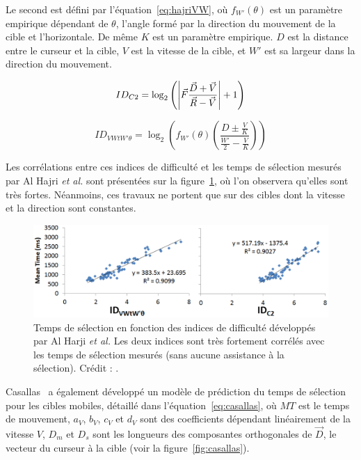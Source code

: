 	Le second est défini par l'équation~\ref{eq:hajriVW}, où $f_{W'}(\theta)$ est un paramètre empirique dépendant de $\theta$, l'angle formé par la direction du mouvement de la cible et l'horizontale. De même $K$ est un paramètre empirique. $D$ est la distance entre le curseur et la cible, $V$ est la vitesse de la cible, et $W'$ est sa largeur dans la direction du mouvement.
	
	\begin{equation}
		\label{eq:hajriC2}
		ID_{C2} = \log_{2}\left(\abs*{\vec{F} \frac{\vec{D}+\vec{V}}{\vec{R}-\vec{V}}} + 1 \right)
	\end{equation}
	
	\begin{equation}
		\label{eq:hajriVW}
		ID_{VWtW'\theta} = \log_{2}\left( f_{W'}(\theta) \left( \frac{D \pm \frac{V}{K}}{\frac{W'}{2} - \frac{V}{K}} \right) \right)
	\end{equation}
	
	Les corrélations entre ces indices de difficulté et les temps de sélection mesurés par Al Hajri \emph{et al.} sont présentées sur la figure~\ref{fig:holdID}, où l'on observera qu'elles sont très fortes. Néanmoins, ces travaux ne portent que sur des cibles dont la vitesse et la direction sont constantes.
	
	\begin{figure}[!htb]
		\centering
		\includegraphics[width=\textwidth]{figures/ch2/holdID}
		\caption[ID vs. nature du mouvement et temps de sélection]{Temps de sélection en fonction des indices de difficulté développés par Al Harji \emph{et al.} Les deux indices sont très fortement corrélés avec les temps de sélection mesurés (sans aucune assistance à la sélection). Crédit : \cite{hajri2011moving}.}
		\label{fig:holdID}
	\end{figure}
	
	Casallas~\cite{casallas2015prediction} a également développé un modèle de prédiction du temps de sélection pour les cibles mobiles, détaillé dans l'équation~\ref{eq:casallas}, où $MT$ est le temps de mouvement, $a_{V}$, $b_{V}$, $c_{V}$ et $d_{V}$ sont des coefficients dépendant linéairement de la vitesse $V$, $D_{m}$ et $D_{s}$ sont les longueurs des composantes orthogonales de $\vec{D}$, le vecteur du curseur à la cible (voir la figure~\ref{fig:casallas}).
	
